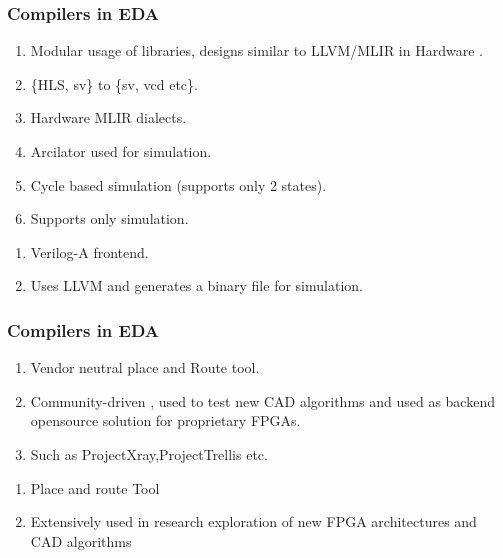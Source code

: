 \documentclass{beamer}
\begin{document}
{\begin{frame}[fragile]
    \frametitle{Compilers in EDA}
        \begin{enumerate}
            \item Modular usage of libraries, designs similar to LLVM/MLIR in Hardware  .
            \item \{HLS, sv\} to \{sv, vcd etc\}.
            \item Hardware MLIR  dialects.
            \item Arcilator used for simulation.
                \item Cycle based simulation (supports only 2 states).
            \item Supports only simulation.
        \end{enumerate}
        \begin{enumerate}
            \item Verilog-A frontend.
            \item Uses LLVM and generates a binary file for simulation.
        \end{enumerate}
\end{frame}

\begin{frame}[fragile]
   \frametitle{Compilers in EDA}
   \begin{enumerate}
   	\item Vendor neutral place and Route tool.
	\item Community-driven , used to test new CAD algorithms and used as backend opensource solution for proprietary FPGAs.
	\item Such as ProjectXray,ProjectTrellis etc.
   \end{enumerate}

   \begin{enumerate}
   	\item Place and route Tool 
	\item Extensively used in research exploration of new FPGA architectures and CAD algorithms
   \end{enumerate}
\end{frame}


}
\end{document}
